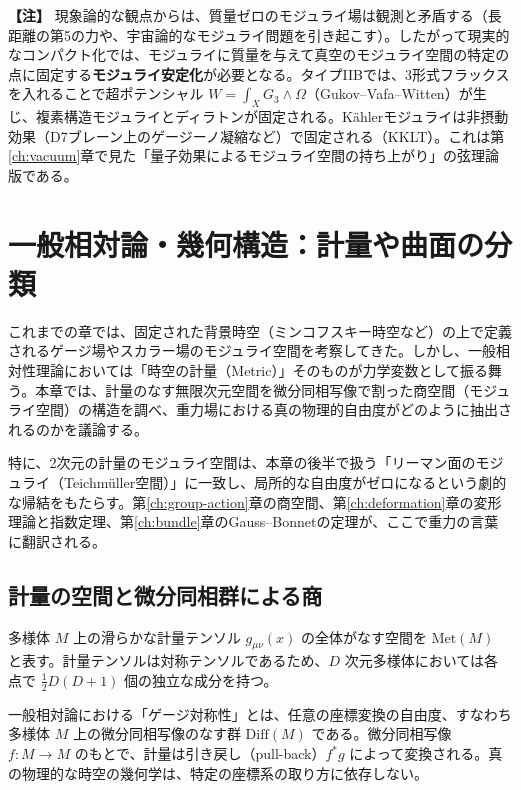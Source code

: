 \documentclass[uplatex, dvipdfmx, book]{jsbook}
\let\origsection\section
\let\origsubsection\subsection
\let\origsubsubsection\subsubsection
\newcommand{\chapter}{\origsection}
\renewcommand{\section}{\origsubsection}
\renewcommand{\subsection}{\origsubsubsection}
\renewcommand{\subsubsection}{\paragraph}
\newenvironment{note}{\vspace{1ex}\par\footnotesize\noindent\textbf{【注】}}{\par\vspace{1ex}}
\begin{document}
\begin{note}
現象論的な観点からは、質量ゼロのモジュライ場は観測と矛盾する（長距離の第5の力や、宇宙論的なモジュライ問題を引き起こす）。したがって現実的なコンパクト化では、モジュライに質量を与えて真空のモジュライ空間の特定の点に固定する\textbf{モジュライ安定化}が必要となる。タイプIIBでは、3形式フラックスを入れることで超ポテンシャル $W = \int_X G_3 \wedge \Omega$（Gukov--Vafa--Witten\cite{gvw2000}）が生じ、複素構造モジュライとディラトンが固定される。K\"ahlerモジュライは非摂動効果（D7ブレーン上のゲージーノ凝縮など）で固定される（KKLT\cite{kklt2003}）。これは第\ref{ch:vacuum}章で見た「量子効果によるモジュライ空間の持ち上がり」の弦理論版である。
\end{note}
\chapter{一般相対論・幾何構造：計量や曲面の分類}
\label{ch:gravity}

これまでの章では、固定された背景時空（ミンコフスキー時空など）の上で定義されるゲージ場やスカラー場のモジュライ空間を考察してきた。しかし、一般相対性理論においては「時空の計量（Metric）」そのものが力学変数として振る舞う。本章では、計量のなす無限次元空間を微分同相写像で割った商空間（モジュライ空間）の構造を調べ、重力場における真の物理的自由度がどのように抽出されるのかを議論する。

特に、2次元の計量のモジュライ空間は、本章の後半で扱う「リーマン面のモジュライ（Teichm\"uller空間）」に一致し、局所的な自由度がゼロになるという劇的な帰結をもたらす。第\ref{ch:group-action}章の商空間、第\ref{ch:deformation}章の変形理論と指数定理、第\ref{ch:bundle}章のGauss--Bonnetの定理が、ここで重力の言葉に翻訳される。

\section{計量の空間と微分同相群による商}

多様体 $M$ 上の滑らかな計量テンソル $g_{\mu\nu}(x)$ の全体がなす空間を $\mathrm{Met}(M)$ と表す。計量テンソルは対称テンソルであるため、$D$ 次元多様体においては各点で $\frac{1}{2}D(D+1)$ 個の独立な成分を持つ。

一般相対論における「ゲージ対称性」とは、任意の座標変換の自由度、すなわち多様体 $M$ 上の微分同相写像のなす群 $\mathrm{Diff}(M)$ である。微分同相写像 $f: M \to M$ のもとで、計量は引き戻し（pull-back）$f^* g$ によって変換される。真の物理的な時空の幾何学は、特定の座標系の取り方に依存しない。
\end{document}
